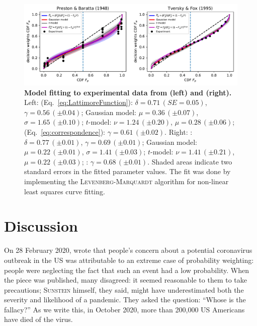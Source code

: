 \documentclass[a4paper, 12pt]{article}
\newcommand{\person}[1]{\textsc{#1}\xspace}
\newcommand{\eref}[1]{(Eq.~\ref{eq:#1})}
\newcommand{\flabel}[1]{\label{fig:#1}}
\begin{document}
\begin{figure}[!htb]
\centering
\includegraphics[width=1.0\textwidth]{./figs/curvefit_PB48_2.pdf}
\caption{\textbf{Model fitting to experimental data from \textcite{curvefit_BP48} (left) and \textcite{TverskyFox1995} (right).}
Left: \textcite{LattimoreBakerWitte1992} \eref{LattimoreFunction}: $\delta=0.71\,\left(SE = 0.05\right)$, $\gamma=0.56\,\left(\pm0.04\right)$; Gaussian model: $\mu=0.36\,\left(\pm0.07\right)$, $\sigma=1.65\,\left(\pm0.10\right)$; $t$-model: $\nu=1.24\,\left(\pm0.20\right)$, $\mu=0.28\,\left(\pm0.06\right)$; \textcite{TverskyKahneman1992} \eref{correspondence}: $\gamma=0.61\,\left(\pm0.02\right)$. Right: \textcite{LattimoreBakerWitte1992}: $\delta=0.77\,\left(\pm0.01\right)$, $\gamma=0.69\,\left(\pm0.01\right)$; Gaussian model: $\mu=0.22\,\left(\pm0.01\right)$, $\sigma=1.41\,\left(\pm0.03\right)$; $t$-model: $\nu=1.41\,\left(\pm0.21\right)$, $\mu=0.22\,\left(\pm0.03\right)$; \textcite{TverskyKahneman1992}: $\gamma=0.68\,\left(\pm0.01\right)$. Shaded areas indicate two standard errors in the fitted parameter values. The fit was done by implementing the \person{Levenberg-Marquardt} algorithm \parencite{Levenberg1944} for non-linear least squares curve fitting.
}
\flabel{curvefit}
\end{figure}


\section{Discussion}

On 28 February 2020, \textcite{Sunstein2020}
wrote that people's concern about a potential coronavirus outbreak in the US was attributable to an extreme case of probability weighting: people were neglecting the fact that such an event had a low probability. When the piece was published, many disagreed: it seemed reasonable to them to take precautions; \person{Sunstein} himself, they said, might have underestimated both the severity and likelihood of a pandemic. They asked the \textcite{Cohen1979a} question: ``Whose is the fallacy?''
As we write this, in October 2020, more than 200,000 US Americans have died of the virus.
\end{document}
